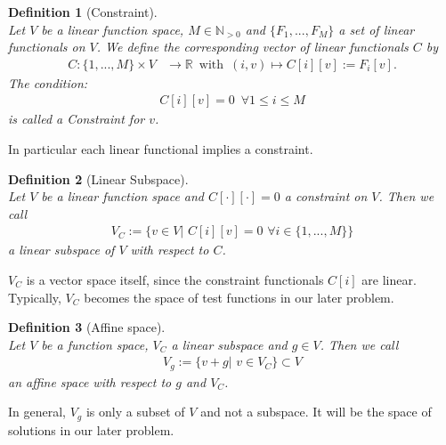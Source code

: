 \documentclass[a4paper,11pt]{article}
\numberwithin{equation}{section}
\newtheorem{definition}{Definition}[section]
\newcommand{\theoremNewline}{\hspace{1mm}\\}
\newcommand{\theoremEndLine}{\hspace{1mm}}
\newcommand{\R}{\mathbb{R}}
\begin{document}
    \begin{definition}[Constraint]\theoremNewline
      \label{definition::analytical_concept::constraint}
      Let $V$ be a linear function space, $M \in \mathbb{N}_{>0}$ and $\{ F_1, ..., F_M \}$ a set of linear
      functionals on $V$. We define the corresponding vector of linear functionals $C$ by
      \begin{align}
        C: \{1,...,M\} \times V &\rightarrow \R \enspace \mbox{with} \enspace (i,v) \mapsto C[i][v] := F_i[v].
      \end{align}
      The condition:
        \begin{align}
        C[i][v] = 0 \enspace \forall 1 \le i \le M
        \end{align}
      is called a \textnormal{Constraint} for $v$.
    \end{definition}

    In particular each linear functional implies a constraint.

    \begin{definition}[Linear Subspace]\theoremNewline
      \label{definition::analytical_concept::linear_subspace}
      Let $V$ be a linear function space and $C[\cdot][\cdot]=0$ a constraint on $V$. Then we call
      \begin{align}
        V_C := \{ v \in V| \hspace{4pt} C[i][v] = 0 \hspace{4pt}\forall i\in\{1,...,M\}\}
      \end{align}
      a \textnormal{linear subspace} of $V$ with respect to $C$.
    \end{definition}

    $V_C$ is a vector space itself, since the constraint functionals $C[i]$ are linear. Typically, $V_C$ becomes the
    space of test functions in our later problem.

    \begin{definition}[Affine space]\theoremNewline
      \label{definition::analytical_concept::affine_space}
      Let $V$ be a function space, $V_C$ a linear subspace and $g \in V$. Then we call
      \begin{align}
        V_{g} := \{ v+g| \hspace{4pt} v \in V_C \} \subset V
      \end{align}
      an \textnormal{affine space} with respect to $g$ and $V_C$.
    \end{definition}\theoremEndLine

    In general, $V_g$ is only a subset of $V$ and not a subspace. It will be the space of solutions in our later
    problem.
\end{document}
